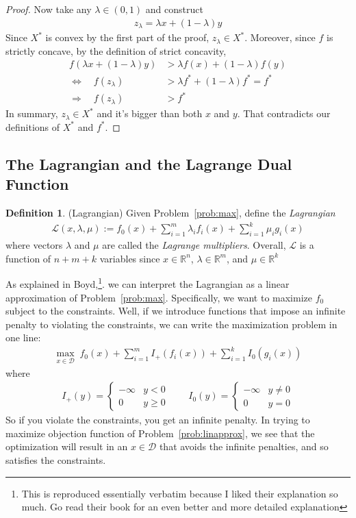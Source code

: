 \documentclass[12pt]{article}
\numberwithin{equation}{section} %
\theoremstyle{plain}
\theoremstyle{definition}
\newtheorem{defn}[thm]{Definition}
\theoremstyle{remark}
\newcommand{\sL}{\mathscr{L}}
\newcommand{\Rn}{\mathbb{R}^n}
\begin{document}
\begin{proof}
Now take any $\lambda\in(0,1)$ and construct
\begin{align*}
  z_\lambda = \lambda x + (1-\lambda)y
\end{align*}
Since $X^*$ is convex by the first part of the proof, $z_\lambda\in
X^*$. Moreover, since $f$ is strictly concave, by the definition of
strict concavity,
\begin{align*}
  f(\lambda x + (1-\lambda) y)
  &>
  \lambda f(x) + (1-\lambda) f(y) \\
  \Leftrightarrow \quad
  f(z_\lambda) &> \lambda f^* + (1-\lambda) f^* = f^* \\
  \Rightarrow\quad
  f(z_\lambda) &> f^*
\end{align*}
In summary, $z_\lambda \in X^*$ and it's bigger than both $x$ and $y$.
That contradicts our definitions of $X^*$ and $f^*$.
\end{proof}

\subsection{The Lagrangian and the Lagrange Dual Function}

\begin{defn}{(Lagrangian)}
Given Problem~\ref{prob:max}, define the \emph{Lagrangian}
\begin{align*}
    \sL(x,\lambda,\mu)
    := f_0(x)
    + \sum^m_{i=1} \lambda_i f_i(x)
    + \sum^k_{i=1} \mu_i g_i(x)
\end{align*}
where vectors $\lambda$ and $\mu$ are called the \emph{Lagrange
multipliers}. Overall, $\sL$ is a function of $n+m+k$ variables since
$x\in\Rn$, $\lambda\in\mathbb{R}^m$, and $\mu\in\mathbb{R}^k$
\end{defn}

As explained in Boyd,\footnote{This is reproduced essentially verbatim
because I liked their explanation so much. Go read their book for an
even better and more detailed explanation}.  we can interpret the
Lagrangian as a linear approximation of Problem~\ref{prob:max}.
Specifically, we want to maximize $f_0$ subject to the constraints.
Well, if we introduce functions that impose an infinite penalty to
violating the constraints, we can write the maximization problem in one
line:
\begin{align}
  \label{prob:linapprox}
  \max_{x\in\mathcal{D}} \;
  f_0(x) + \sum^m_{i=1} I_+(f_i(x))
  + \sum^k_{i=1} I_0(g_i(x))
\end{align}
where
\begin{align*}
  I_+(y) =
  \begin{cases}
    -\infty & y < 0 \\
    0 & y \geq 0
  \end{cases}
  \qquad
  I_0(y) =
  \begin{cases}
    -\infty & y \neq 0 \\
    0 & y = 0
  \end{cases}
\end{align*}
So if you violate the constraints, you get an infinite penalty.  In
trying to maximize objection function of Problem~\ref{prob:linapprox},
we see that the optimization will result in an $x\in\mathcal{D}$ that
avoids the infinite penalties, and so satisfies the constraints.
\end{document}

